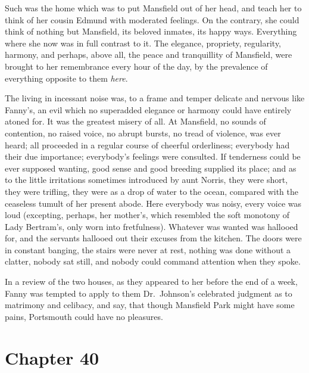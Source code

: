 Such was the home which was to put Mansfield out of
her head, and teach her to think of her cousin Edmund with
moderated feelings.  On the contrary, she could think of
nothing but Mansfield, its beloved inmates, its happy ways.
Everything where she now was in full contrast to it.
The elegance, propriety, regularity, harmony, and perhaps,
above all, the peace and tranquillity of Mansfield,
were brought to her remembrance every hour of the day,
by the prevalence of everything opposite to them \emph{here}.

The living in incessant noise was, to a frame and temper
delicate and nervous like Fanny's, an evil which no
superadded elegance or harmony could have entirely
atoned for.  It was the greatest misery of all.
At Mansfield, no sounds of contention, no raised voice,
no abrupt bursts, no tread of violence, was ever heard;
all proceeded in a regular course of cheerful orderliness;
everybody had their due importance; everybody's feelings
were consulted.  If tenderness could be ever supposed wanting,
good sense and good breeding supplied its place; and as to
the little irritations sometimes introduced by aunt Norris,
they were short, they were trifling, they were as a drop
of water to the ocean, compared with the ceaseless
tumult of her present abode.  Here everybody was noisy,
every voice was loud (excepting, perhaps, her mother's,
which resembled the soft monotony of Lady Bertram's,
only worn into fretfulness). Whatever was wanted was
hallooed for, and the servants hallooed out their excuses
from the kitchen.  The doors were in constant banging,
the stairs were never at rest, nothing was done without
a clatter, nobody sat still, and nobody could command
attention when they spoke.

In a review of the two houses, as they appeared to her
before the end of a week, Fanny was tempted to apply
to them Dr.\ Johnson's celebrated judgment as to matrimony
and celibacy, and say, that though Mansfield Park might
have some pains, Portsmouth could have no pleasures.



\chapter{Chapter 40}

